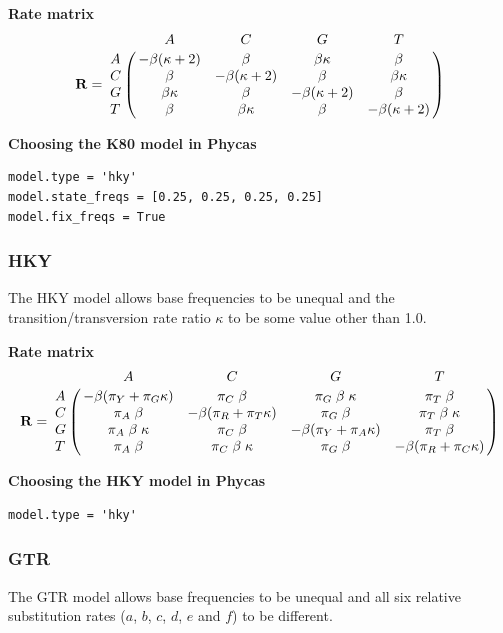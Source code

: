\documentclass[10pt]{article}
\newcommand{\phycas}{{\sc Phycas}\index{Phycas}}
\begin{document}
\begin{samepage}
{\bf Rate matrix}
$${\bf R} = \bordermatrix{ &         A          &         C          &        G          &         T          \cr
                         A & -\beta(\kappa + 2) &  \beta             &  \beta \kappa     &  \beta             \cr
                         C &  \beta             & -\beta(\kappa + 2) &  \beta            &  \beta \kappa      \cr
                         G &  \beta \kappa      &  \beta             & -\beta(\kappa + 2)&  \beta             \cr
                         T &  \beta             &  \beta \kappa      &  \beta            & -\beta(\kappa + 2) \cr}$$
\end{samepage}

\begin{samepage}
{\bf Choosing the K80 model in \phycas}
\begin{verbatim}
model.type = 'hky'
model.state_freqs = [0.25, 0.25, 0.25, 0.25]
model.fix_freqs = True
\end{verbatim}
\end{samepage}

\subsubsection{HKY}
The HKY model \citep{HasegawaKishinoYano1985} allows base frequencies to be unequal and the transition/transversion rate ratio $\kappa$ to be some value other than 1.0.

\begin{samepage}
{\bf Rate matrix}
$${\bf R} = \bordermatrix{ &       A      &       C       &       G       &       T       \cr
A & -\beta (\pi_Y + \pi_G \kappa) & \pi_C \; \beta  & \pi_G \; \beta \; \kappa  & \pi_T \; \beta  \cr
C & \pi_A \; \beta & -\beta (\pi_R + \pi_T \kappa) & \pi_G \; \beta  & \pi_T \; \beta \; \kappa  \cr
G & \pi_A \; \beta \; \kappa & \pi_C \; \beta  & -\beta (\pi_Y + \pi_A \kappa) & \pi_T \; \beta  \cr
T & \pi_A \; \beta & \pi_C \; \beta \; \kappa  & \pi_G \; \beta  & -\beta (\pi_R + \pi_C \kappa) \cr}$$
\end{samepage}

\begin{samepage}
{\bf Choosing the HKY model in \phycas}
\begin{verbatim}
model.type = 'hky'
\end{verbatim}
\end{samepage}

\subsubsection{GTR}
The GTR model \citep{LanavePreparataSacconeSerio1984} allows base frequencies to be unequal and all six relative substitution rates ($a$, $b$, $c$, $d$, $e$ and $f$) to be different.
\end{document}
